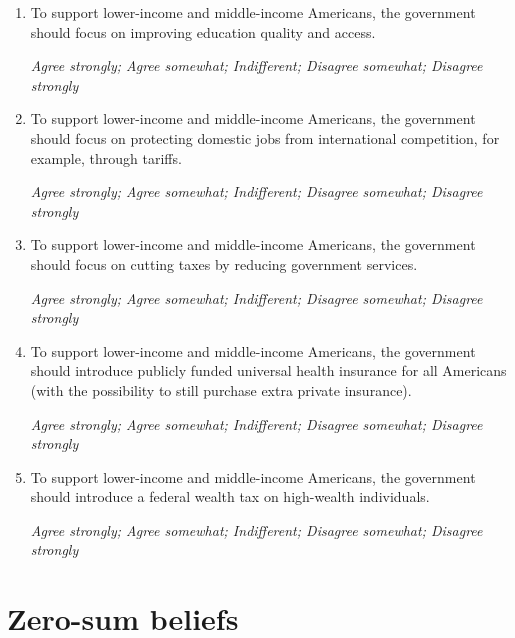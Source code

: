 \documentclass[11pt, headsepline]{article}
\begin{document}
\begin{enumerate}[resume]
    \item To support lower-income and middle-income Americans, the government should focus on improving education quality and access.

    \textit{Agree strongly; Agree somewhat; Indifferent; Disagree somewhat; Disagree strongly}

    \item To support lower-income and middle-income Americans, the government should focus on protecting domestic jobs from international competition, for example, through tariffs.

    \textit{Agree strongly; Agree somewhat; Indifferent; Disagree somewhat; Disagree strongly}

    \item To support lower-income and middle-income Americans, the government should focus on cutting taxes by reducing government services.

    \textit{Agree strongly; Agree somewhat; Indifferent; Disagree somewhat; Disagree strongly}

    \item To support lower-income and middle-income Americans, the government should introduce publicly funded universal health insurance for all Americans (with the possibility to still purchase extra private insurance).

    \textit{Agree strongly; Agree somewhat; Indifferent; Disagree somewhat; Disagree strongly}

    \item To support lower-income and middle-income Americans, the government should introduce a federal wealth tax on high-wealth individuals.

    \textit{Agree strongly; Agree somewhat; Indifferent; Disagree somewhat; Disagree strongly}
    
\end{enumerate}

\section*{Zero-sum beliefs}
\end{document}
